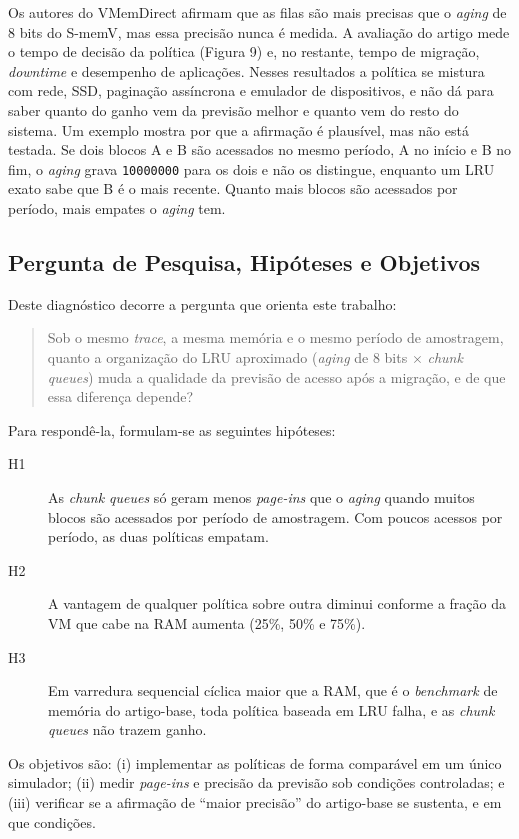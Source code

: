 \documentclass[12pt]{article}
\begin{document}
Os autores do VMemDirect afirmam que as filas são mais precisas que o \textit{aging} de 8 bits do S-memV, mas essa precisão nunca é medida. A avaliação do artigo mede o tempo de decisão da política (Figura 9) e, no restante, tempo de migração, \textit{downtime} e desempenho de aplicações. Nesses resultados a política se mistura com rede, SSD, paginação assíncrona e emulador de dispositivos, e não dá para saber quanto do ganho vem da previsão melhor e quanto vem do resto do sistema. Um exemplo mostra por que a afirmação é plausível, mas não está testada. Se dois blocos A e B são acessados no mesmo período, A no início e B no fim, o \textit{aging} grava \texttt{10000000} para os dois e não os distingue, enquanto um LRU exato sabe que B é o mais recente. Quanto mais blocos são acessados por período, mais empates o \textit{aging} tem.

\subsection{Pergunta de Pesquisa, Hipóteses e Objetivos}

Deste diagnóstico decorre a pergunta que orienta este trabalho:

\begin{quote}
Sob o mesmo \textit{trace}, a mesma memória e o mesmo período de amostragem, quanto a organização do LRU aproximado (\textit{aging} de 8 bits $\times$ \textit{chunk queues}) muda a qualidade da previsão de acesso após a migração, e de que essa diferença depende?
\end{quote}

Para respondê-la, formulam-se as seguintes hipóteses:

\begin{description}
\item[H1] As \textit{chunk queues} só geram menos \textit{page-ins} que o \textit{aging} quando muitos blocos são acessados por período de amostragem. Com poucos acessos por período, as duas políticas empatam.
\item[H2] A vantagem de qualquer política sobre outra diminui conforme a fração da VM que cabe na RAM aumenta (25\%, 50\% e 75\%).
\item[H3] Em varredura sequencial cíclica maior que a RAM, que é o \textit{benchmark} de memória do artigo-base, toda política baseada em LRU falha, e as \textit{chunk queues} não trazem ganho.
\end{description}

Os objetivos são: (i) implementar as políticas de forma comparável em um único simulador; (ii) medir \textit{page-ins} e precisão da previsão sob condições controladas; e (iii) verificar se a afirmação de ``maior precisão'' do artigo-base se sustenta, e em que condições.
\end{document}
